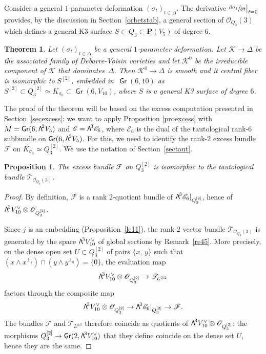 \documentclass[11pt]{article}
\let\mathcal\mathscr
\newtheorem{theo}[lemm]{Theorem}
\newtheorem{prop}[lemm]{Proposition}
\theoremstyle{definition}
\renewcommand\P{{\mathbf P}}\let\PP\P
\newcommand\cE{\mathcal{E}}
\newcommand\cF{\mathcal{F}}
\newcommand\cK{\mathcal{K}}
\newcommand\cO{\mathcal{O}}\let\OO\cO
\newcommand\cT{\mathcal{T}}
\DeclareMathOperator{\Gr}{\mathsf{Gr}}
\let\isom\simeq
\let\dual\vee
\newcommand\bw[1]{{\hbox{\large$\mathsf{\Lambda}$}^{\!#1}}}
\newcommand\Qtrois{{Q_3}}
\newcommand\hilb{{Q_3^{[2]}}}
\newcommand\hilbS{S^{[2]}}
\begin{document}
Consider a general $1$-parameter deformation $(\sigma_t)_{t\in \Delta}$. The
derivative $ \sfrac{\partial\sigma_t}{\partial t}\big\vert_{t=0}$ provides, by the discussion in Section~\ref{orbetstab}, a general section of
$\cO_{\Qtrois}(3)$
which defines a general
K3 surface $S\subset \Qtrois\subset \P(V_5)$ of degree 6.

\begin{theo}\label{theoprecis}
Let $(\sigma_t)_{t\in \Delta}$ be a general $1$-parameter deformation.
Let $\cK\to\Delta$ be the associated family of Debarre-Voisin varieties and let $\cK^0$ be the irreducible component of $\cK$ that dominates~$\Delta$.
Then $\cK^0\to \Delta$
is smooth and it central fiber is isomorphic to $\hilbS$, embedded in~$\Gr(6,10)$ as $\hilbS\subset Q_3^{[2]}\isom K_{\sigma_0}\subset \Gr(6,V_{10})$, where
$S$ is a general K3 surface of degree $6$.
\end{theo}

The proof of the theorem will be based on the excess computation presented in Section~\ref{secexcess}: we want to
apply Proposition \ref{proexcess} with $M=\Gr (6,\bw2 V_5)$ and $\cE=\bw3 \cE_6$, where $\cE_6$ is the dual of the tautological rank-6 subbundle on $\Gr (6,\bw2 V_5)$.
For this, we need to identify the rank-$2$ excess bundle~$\cF$ on $K_{\sigma_0}\isom\hilb$. We use the notation of Section~\ref{sectaut}.

\begin{prop}\label{Festtauto3}
The excess bundle $\cF$ on $\hilb$ is isomorphic to the tautological
bundle $\cT_{\cO_{\Qtrois}(3)}$.
\end{prop}

\begin{proof}
By definition, $\cF$ is a rank $2$-quotient bundle of $\bw3\cE_6\vert_{ \hilb}$, hence of \hbox{$\bw3V_{10}^\vee\otimes \cO_{\hilb}$}.

Since $j$ is an embedding (Proposition~\ref{le11}), the rank-$2$ vector bundle $\cT_{\cO_{\Qtrois}(3)}$ is generated by the space
$
\bw3 V_{10}^\vee$ of global sections by Remark~\ref{re45}. More precisely, on the dense open set $U\subset \hilb$ of pairs
$\{x,\,y\}$ such that $(x\wedge x^{\perp_q} )\cap( y\wedge y^{\perp_q})=\{0\}$, the evaluation map
\begin{equation}\label{eq17}
\bw3V_{10}^\vee\otimes \cO_{Q_3^{[2]}}\to \cT_{L^{\otimes 3}}
\end{equation}
factors through the composite map
\begin{equation}\label{eq18}
\bw3V_{10}^\vee\otimes \cO_{\hilb}\to \bw3\cE_6\vert_{ \hilb}\to \cF.
\end{equation}
The bundles $\cF$ and $\cT_{L^{\otimes 3}}$ therefore coincide as quotients of $\bw3V_{10}^\vee\otimes \cO_{Q_3^{[2]}}$: the morphisms $\hilb\to \Gr(2,\bw3 V_{10}^\dual)$ that they define coincide on the dense set $U$, hence they are the same.
\end{proof}
\end{document}
